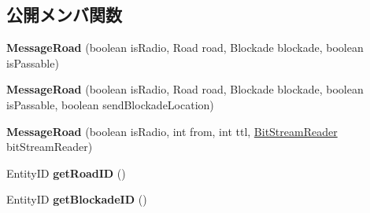 \subsection*{公開メンバ関数}
\begin{DoxyCompactItemize}
\item 
\hypertarget{classadf_1_1agent_1_1communication_1_1standard_1_1bundle_1_1information_1_1MessageRoad_a3f87c5cb8a5bcec1466c985eee8a915b}{}\label{classadf_1_1agent_1_1communication_1_1standard_1_1bundle_1_1information_1_1MessageRoad_a3f87c5cb8a5bcec1466c985eee8a915b} 
{\bfseries Message\+Road} (boolean is\+Radio, Road road, Blockade blockade, boolean is\+Passable)
\item 
\hypertarget{classadf_1_1agent_1_1communication_1_1standard_1_1bundle_1_1information_1_1MessageRoad_aa695589432046b9ccd61258fcb059b7a}{}\label{classadf_1_1agent_1_1communication_1_1standard_1_1bundle_1_1information_1_1MessageRoad_aa695589432046b9ccd61258fcb059b7a} 
{\bfseries Message\+Road} (boolean is\+Radio, Road road, Blockade blockade, boolean is\+Passable, boolean send\+Blockade\+Location)
\item 
\hypertarget{classadf_1_1agent_1_1communication_1_1standard_1_1bundle_1_1information_1_1MessageRoad_a0ebfa1d85c2e3dd67d751783e0b99308}{}\label{classadf_1_1agent_1_1communication_1_1standard_1_1bundle_1_1information_1_1MessageRoad_a0ebfa1d85c2e3dd67d751783e0b99308} 
{\bfseries Message\+Road} (boolean is\+Radio, int from, int ttl, \hyperlink{classadf_1_1component_1_1communication_1_1util_1_1BitStreamReader}{Bit\+Stream\+Reader} bit\+Stream\+Reader)
\item 
\hypertarget{classadf_1_1agent_1_1communication_1_1standard_1_1bundle_1_1information_1_1MessageRoad_a9dfb5acf5e94af347fe8036601f87b3a}{}\label{classadf_1_1agent_1_1communication_1_1standard_1_1bundle_1_1information_1_1MessageRoad_a9dfb5acf5e94af347fe8036601f87b3a} 
Entity\+ID {\bfseries get\+Road\+ID} ()
\item 
\hypertarget{classadf_1_1agent_1_1communication_1_1standard_1_1bundle_1_1information_1_1MessageRoad_a0debc0a4c350bfb4ccb7edd6cdbd98e6}{}\label{classadf_1_1agent_1_1communication_1_1standard_1_1bundle_1_1information_1_1MessageRoad_a0debc0a4c350bfb4ccb7edd6cdbd98e6} 
Entity\+ID {\bfseries get\+Blockade\+ID} ()
\item 
\hypertarget{classadf_1_1agent_1_1communication_1_1standard_1_1bundle_1_1information_1_1MessageRoad_a555dd76ef98b3b55079e7df1b01d2c1e}{}\label{classadf_1_1agent_1_1communication_1_1standard_1_1bundle_1_1information_1_1MessageRoad_a555dd76ef98b3b55079e7df1b01d2c1e} 

\end{DoxyCompactItemize}
